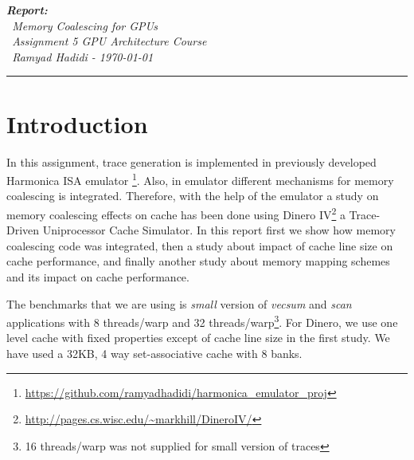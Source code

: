 \documentclass{article}
\author{Ramyad Hadidi}
\date{\today}
\begin{document}

	
\begin{minipage}[t]{1.0\textwidth}
 \emph{\indent\textbf{Report:} \\
		   \-\ Memory Coalescing for GPUs \\
		   \-\ Assignment 5 GPU Architecture Course \\
		   \-\ Ramyad Hadidi - \today
  }
\end{minipage}

\vspace{3 mm}
\hrule
\vspace{3 mm}

\section{Introduction}
In this assignment, trace generation is implemented in previously developed Harmonica ISA emulator \footnote{\url{https://github.com/ramyadhadidi/harmonica_emulator_proj}}. Also, in emulator different mechanisms for memory coalescing is integrated. Therefore, with the help of the emulator a study on memory coalescing effects on cache has been done using Dinero IV\footnote{\url{http://pages.cs.wisc.edu/~markhill/DineroIV/}} a Trace-Driven Uniprocessor Cache Simulator. In this report first we show how memory coalescing code was integrated, then a study about impact of cache line size on cache performance, and finally another study about memory mapping schemes and its impact on cache performance.

The benchmarks that we are using is \emph{small} version of \emph{vecsum} and \emph{scan} applications with 8 threads/warp and 32 threads/warp\footnote{16 threads/warp was not supplied for small version of traces}. For Dinero, we use one level cache with fixed properties except of cache line size in the first study. We have used a 32KB, 4 way set-associative cache with 8 banks.
\end{document}
